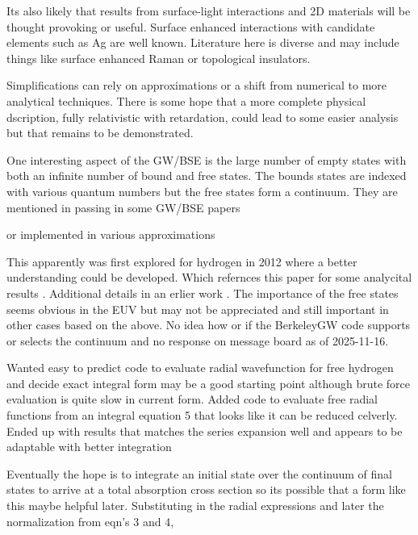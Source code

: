 Its also likely that results from surface-light interactions and
2D materials will be thought provoking or useful. Surface enhanced
interactions with candidate elements such as Ag are well known.
Literature here is diverse and may include things like surface
enhanced Raman or topological insulators. 

Simplifications can rely on approximations or a shift from numerical
to more analytical techniques. There is some hope that a more complete
physical dscription, fully relativistic with retardation, could
lead to some easier analysis but that remains to be demonstrated.


One interesting aspect of the GW/BSE is the large number of
empty states with both an infinite number of
bound and free states. 
The bounds states are indexed with various quantum numbers but the
free states form a continuum. 
They are mentioned in passing in some GW/BSE papers
\cite{Hung_daJornada_SoutoCasares_Excitation_spectra_aromatic_2016}

or implemented in various approximations
\cite{Hofierka_Rawlins_Cunningham_Many_body_theory_calculations_2023}


This apparently was first explored for hydrogen
in 2012 
\cite{Sakuma_Aryasetiawan_Self_energy_calculation_2012}
where a better understanding could be developed.
Which refernces this paper for some analycital results
\cite{Yamagami_Takada_Strong_Electron_Correlation_1998}.
Additional details in an erlier work 
\cite{Godby_Schluter_Sham_Self_energy_operators_1988}.
The importance of the free states seems obvious in the EUV
but may not be appreciated and still important in other cases
based on the above. No idea how or if the BerkeleyGW code
supports or selects the continuum  and no response on 
message board as of 2025-11-16.

Wanted easy to predict code to evaluate radial wavefunction
for free hydrogen and decide exact integral form may be 
a good starting point although brute force evaluation is quite slow
in current form. 
Added code to evaluate free radial functions from an integral
\cite{LOPEZ20101570} equation 5 that looks like it can be reduced celverly.
Ended up with results that matches the series expansion well and appears
to be adaptable with better integration

Eventually the hope is to integrate an initial state over the continuum
of final states to arrive at a total absorption cross section so its
possible that a form like this maybe helpful later. 
Substituting in the radial expressions
and later the normalization from 
\cite{Sakuma_Aryasetiawan_Self_energy_calculation_2012}
eqn's 3 and 4,

